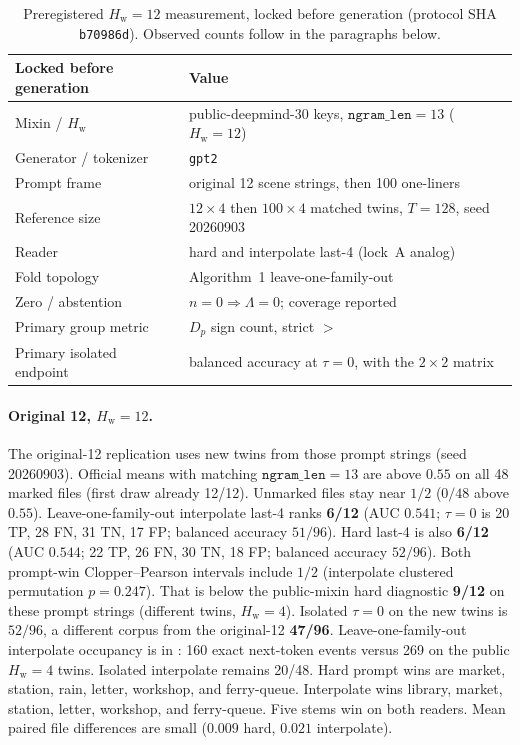 \documentclass[11pt,a4paper]{article}
\theoremstyle{definition}
\newcommand{\LLR}{\Lambda}
\newcommand{\Hw}{H_{\mathrm{w}}}
\begin{document}
\begin{table}[ht]
\centering
\small
\caption{Preregistered $\Hw=12$ measurement, locked before generation
(protocol SHA \texttt{b70986d}). Observed counts follow in the
paragraphs below.}
\label{tab:nextlock}
\begin{tabular}{ll}
\toprule
Locked before generation & Value \\
\midrule
Mixin / $\Hw$ & public-deepmind-30 keys, $\mathtt{ngram\_len}=13$ ($\Hw=12$) \\
Generator / tokenizer & \texttt{gpt2} \\
Prompt frame & original 12 scene strings, then 100 one-liners \\
Reference size & $12\times 4$ then $100\times 4$ matched twins, $T=128$, seed 20260903 \\
Reader & hard and interpolate last-4 (lock~A analog) \\
Fold topology & Algorithm~1 leave-one-family-out \\
Zero / abstention & $n=0\Rightarrow\LLR=0$; coverage reported \\
Primary group metric & $D_p$ sign count, strict $>$ \\
Primary isolated endpoint & balanced accuracy at $\tau=0$, with the $2\times 2$ matrix \\
\bottomrule
\end{tabular}
\end{table}

\paragraph{Original 12, $\Hw=12$.}
The original-12 replication uses new twins from those prompt strings
(seed 20260903). Official means with matching $\mathtt{ngram\_len}=13$
are above $0.55$ on all 48 marked files (first draw already 12/12).
Unmarked files stay near $1/2$ ($0/48$ above $0.55$).
Leave-one-family-out interpolate last-4 ranks \textbf{6/12} (AUC
$0.541$; $\tau=0$ is 20 TP, 28 FN, 31 TN, 17 FP; balanced accuracy
$51/96$). Hard last-4 is also \textbf{6/12} (AUC $0.544$; 22 TP, 26 FN,
30 TN, 18 FP; balanced accuracy $52/96$). Both prompt-win Clopper--Pearson
intervals include $1/2$ (interpolate clustered permutation $p=0.247$).
That is below the public-mixin hard diagnostic
\textbf{9/12} on these prompt strings (different twins, $\Hw=4$).
Isolated $\tau=0$ on the new twins is $52/96$, a different corpus from
the original-12 \textbf{47/96}.
Leave-one-family-out interpolate occupancy is in :
160 exact next-token events versus 269 on the public $\Hw=4$ twins.
Isolated interpolate remains 20/48.
Hard prompt wins are market, station, rain, letter, workshop, and
ferry-queue. Interpolate wins library, market, station, letter,
workshop, and ferry-queue. Five stems win on both readers. Mean paired
file differences are small ($0.009$ hard, $0.021$ interpolate).
\end{document}
